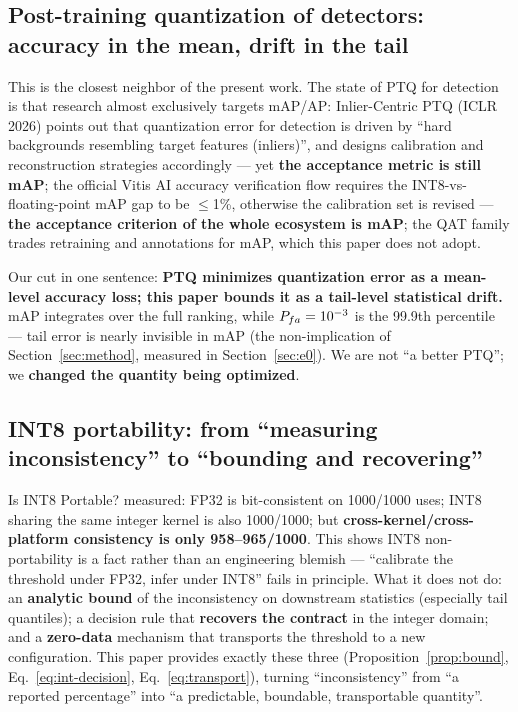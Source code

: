 \subsection{Post-training quantization of detectors: accuracy in the mean, drift in the tail}
\label{sec:rw-ptq}

This is the closest neighbor of the present work.
The state of PTQ for detection is that research almost exclusively targets mAP/AP: Inlier-Centric PTQ \citep{icptq} (ICLR 2026) points out that quantization error for detection is driven by ``hard backgrounds resembling target features (inliers)'', and designs calibration and reconstruction strategies accordingly --- yet \textbf{the acceptance metric is still mAP}; the official Vitis AI accuracy verification flow \citep{vitisai} requires the INT8-vs-floating-point mAP gap to be $\le$1\%, otherwise the calibration set is revised --- \textbf{the acceptance criterion of the whole ecosystem is mAP}; the QAT family trades retraining and annotations for mAP, which this paper does not adopt.

Our cut in one sentence: \textbf{PTQ minimizes quantization error as a mean-level accuracy loss; this paper bounds it as a tail-level statistical drift.}
mAP integrates over the full ranking, while $P_{fa}=10^{-3}$ is the 99.9th percentile --- tail error is nearly invisible in mAP (the non-implication of Section~\ref{sec:method}, measured in Section~\ref{sec:e0}).
We are not ``a better PTQ''; we \textbf{changed the quantity being optimized}.

\subsection{INT8 portability: from ``measuring inconsistency'' to ``bounding and recovering''}
\label{sec:rw-int8}

Is INT8 Portable? \citep{int8portable} measured: FP32 is bit-consistent on 1000/1000 uses; INT8 sharing the same integer kernel is also 1000/1000; but \textbf{cross-kernel/cross-platform consistency is only 958--965/1000}.
This shows INT8 non-portability is a fact rather than an engineering blemish --- ``calibrate the threshold under FP32, infer under INT8'' fails in principle.
What it does not do: an \textbf{analytic bound} of the inconsistency on downstream statistics (especially tail quantiles); a decision rule that \textbf{recovers the contract} in the integer domain; and a \textbf{zero-data} mechanism that transports the threshold to a new configuration.
This paper provides exactly these three (Proposition~\ref{prop:bound}, Eq.~\eqref{eq:int-decision}, Eq.~\eqref{eq:transport}), turning ``inconsistency'' from ``a reported percentage'' into ``a predictable, boundable, transportable quantity''.

